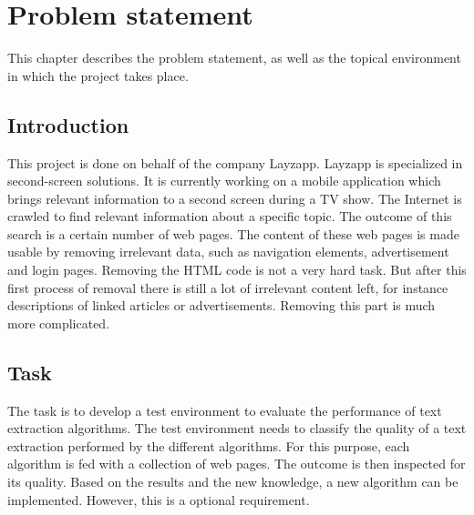 
\chapter{Problem statement} %

\label{Problem statement} %



This chapter describes the problem statement, as well as the topical environment in which the project takes place.



\section{Introduction}

This project is done on behalf of the company Layzapp. Layzapp is specialized in second-screen solutions. It is currently working on a mobile application which brings relevant information to a second screen during a TV show. The Internet is crawled to find relevant information about a specific topic. The outcome of this search is a certain number of web pages. The content of these web pages is made usable by removing irrelevant data, such as navigation elements, advertisement and login pages. Removing the HTML code is not a very hard task. But after this first process of removal there is still a lot of irrelevant content left, for instance descriptions of linked articles or advertisements. Removing this part is much more complicated. 

\section{Task}

The task is to develop a test environment to evaluate the performance of text extraction algorithms. The test environment needs to classify the quality of a text extraction performed by the different algorithms. For this purpose, each algorithm is fed with a collection of web pages. The outcome is then inspected for its quality. Based on the results and the new knowledge, a new algorithm can be implemented. However, this is a optional requirement.

